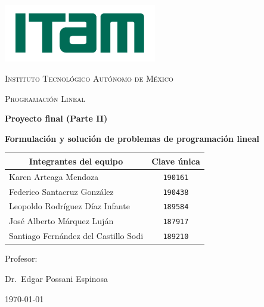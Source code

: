 \begin{titlepage}
	\centering
	\includegraphics[width=0.5\textwidth]{logo-ITAM.pdf}\par\vspace{1cm}
	{\scshape\large Instituto Tecnológico Autónomo de México \par}
	\vspace{2.5cm}
	
	{\scshape\Large Programación Lineal\par}
	\vspace{1.5cm}
	{\LARGE\bfseries Proyecto final (Parte II)\par}
    \vspace{0.5cm}
	{\large\bfseries Formulación y solución de problemas de programación lineal}
	\vspace{3cm}
	
	{\large
	\begin{tabular}{||l c||} 
         \hline
         \multicolumn{1}{||c}{\textbf{Integrantes del equipo}} & \textbf{Clave única} \\
         \hline\hline
         Karen Arteaga Mendoza & \texttt{190161} \\ 
         \hline
         Federico Santacruz González & \texttt{190438}\\
         \hline
         Leopoldo Rodríguez Díaz Infante & \texttt{189584} \\ 
         \hline
         José Alberto Márquez Luján & \texttt{187917} \\
         \hline
         Santiago Fernández del Castillo Sodi & \texttt{189210} \\
         \hline
    \end{tabular}
    }
	\vfill
	Profesor:\par
	Dr.~Edgar Possani Espinosa

	\vfill
	{\today\par}
\end{titlepage}